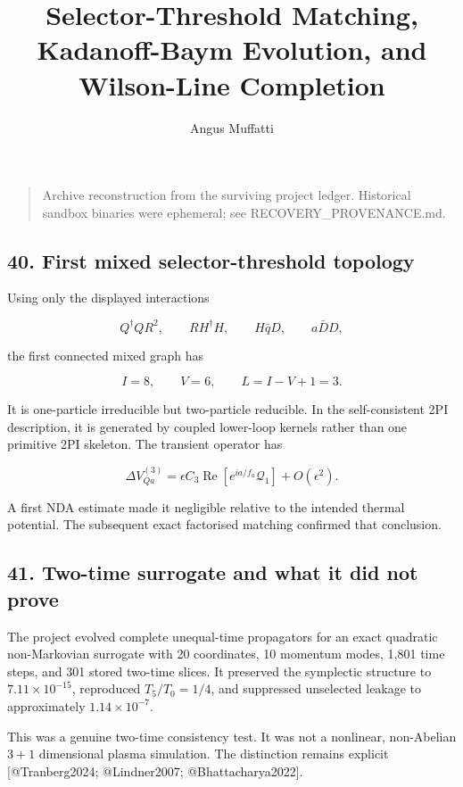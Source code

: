 \documentclass[
]{article}
\title{Selector-Threshold Matching, Kadanoff-Baym Evolution, and
Wilson-Line Completion}
\author{Angus Muffatti}
\date{}
\begin{document}
\maketitle

\begin{quote}
Archive reconstruction from the surviving project ledger. Historical
sandbox binaries were ephemeral; see RECOVERY\_PROVENANCE.md.
\end{quote}

\hypertarget{first-mixed-selector-threshold-topology}{%
\subsection{40. First mixed selector-threshold
topology}\label{first-mixed-selector-threshold-topology}}

Using only the displayed interactions

\[
Q^\dagger QR^2,
\qquad
RH^\dagger H,
\qquad
H\bar qD,
\qquad
a\bar DD,
\]

the first connected mixed graph has

\[
I=8,
\qquad
V=6,
\qquad
L=I-V+1=3.
\]

It is one-particle irreducible but two-particle reducible. In the
self-consistent 2PI description, it is generated by coupled lower-loop
kernels rather than one primitive 2PI skeleton. The transient operator
has

\[
\Delta V_{Qa}^{(3)}
=\epsilon C_3
\operatorname{Re}[e^{ia/f_a}\mathcal Q_1]
+O(\epsilon^2).
\]

A first NDA estimate made it negligible relative to the intended thermal
potential. The subsequent exact factorised matching confirmed that
conclusion.

\hypertarget{two-time-surrogate-and-what-it-did-not-prove}{%
\subsection{41. Two-time surrogate and what it did not
prove}\label{two-time-surrogate-and-what-it-did-not-prove}}

The project evolved complete unequal-time propagators for an exact
quadratic non-Markovian surrogate with 20 coordinates, 10 momentum
modes, 1,801 time steps, and 301 stored two-time slices. It preserved
the symplectic structure to \(7.11\times10^{-15}\), reproduced
\(T_5/T_0=1/4\), and suppressed unselected leakage to approximately
\(1.14\times10^{-7}\).

This was a genuine two-time consistency test. It was not a nonlinear,
non-Abelian \(3+1\) dimensional plasma simulation. The distinction
remains explicit {[}@Tranberg2024; @Lindner2007; @Bhattacharya2022{]}.
\end{document}
